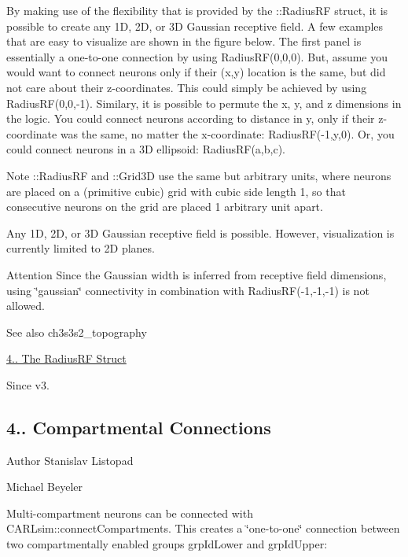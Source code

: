  By making use of the flexibility that is provided by the \+::\+Radius\+RF struct, it is possible to create any 1D, 2D, or 3D Gaussian receptive field. A few examples that are easy to visualize are shown in the figure below. The first panel is essentially a one-\/to-\/one connection by using Radius\+R\+F(0,0,0). But, assume you would want to connect neurons only if their (x,y) location is the same, but did not care about their z-\/coordinates. This could simply be achieved by using Radius\+RF(0,0,-\/1). Similary, it is possible to permute the x, y, and z dimensions in the logic. You could connect neurons according to distance in y, only if their z-\/coordinate was the same, no matter the x-\/coordinate\+: Radius\+RF(-\/1,y,0). Or, you could connect neurons in a 3D ellipsoid\+: Radius\+R\+F(a,b,c).

 \begin{DoxyNote}{Note}
\+::\+Radius\+RF and \+::\+Grid3D use the same but arbitrary units, where neurons are placed on a (primitive cubic) grid with cubic side length 1, so that consecutive neurons on the grid are placed 1 arbitrary unit apart. 

Any 1D, 2D, or 3D Gaussian receptive field is possible. However, visualization is currently limited to 2D planes. 
\end{DoxyNote}
\begin{DoxyAttention}{Attention}
Since the Gaussian width is inferred from receptive field dimensions, using \char`\"{}gaussian\char`\"{} connectivity in combination with Radius\+RF(-\/1,-\/1,-\/1) is not allowed.
\end{DoxyAttention}
\begin{DoxySeeAlso}{See also}
ch3s3s2\+\_\+topography 

\hyperlink{ch4_connections_ch4s1s3_radiusRF}{4.. The Radius\+RF Struct} 
\end{DoxySeeAlso}
\begin{DoxySince}{Since}
v3.
\end{DoxySince}
\hypertarget{ch4_connections_ch4s1s9_compconn}{}\subsection{4.. Compartmental Connections}\label{ch4_connections_ch4s1s9_compconn}
\begin{DoxyAuthor}{Author}
Stanislav Listopad 

Michael Beyeler
\end{DoxyAuthor}
Multi-\/compartment neurons can be connected with C\+A\+R\+Lsim\+::connect\+Compartments. This creates a \char`\"{}one-\/to-\/one\char`\"{} connection between two compartmentally enabled groups {\ttfamily grp\+Id\+Lower} and {\ttfamily grp\+Id\+Upper}\+:


